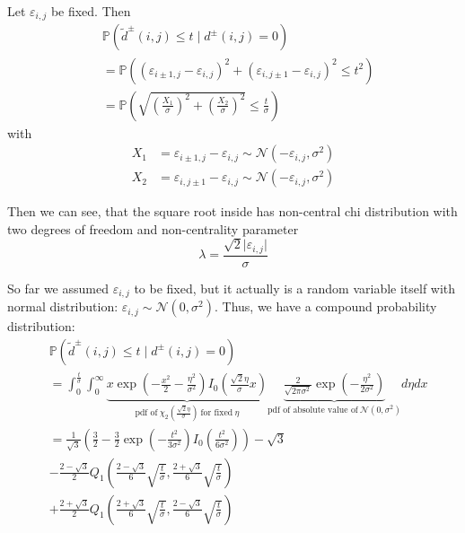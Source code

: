 \documentclass{beamer}
\newcommand{\abs}[1]{\lvert#1\rvert}
\begin{document}
\begin{frame}
	Let $\varepsilon_{i, j}$ be fixed. Then
	\begin{align*}
		&\mathbb{P}(\tilde{d}^\pm(i, j) \leq t \mid d^\pm(i, j) = 0) \\
		&= \mathbb{P}\left( (\varepsilon_{i \pm 1, j} - \varepsilon_{i, j})^2 + (\varepsilon_{i, j \pm 1} - \varepsilon_{i, j})^2 \leq t^2 \right) \\
		&= \mathbb{P}\left( \sqrt{\left( \frac{X_1}{\sigma} \right)^2 + \left( \frac{X_2}{\sigma} \right)^2} \leq \frac{t}{\sigma} \right)
	\end{align*}
	with
	\begin{align*}
		X_1 &= \varepsilon_{i \pm 1, j} - \varepsilon_{i, j} \sim \mathcal{N}(- \varepsilon_{i, j}, \sigma^2) \\
		X_2 &= \varepsilon_{i, j \pm 1} - \varepsilon_{i, j} \sim \mathcal{N}(- \varepsilon_{i, j}, \sigma^2)
	\end{align*}
	
	Then we can see, that the square root inside has non-central chi distribution with two degrees of freedom and non-centrality parameter
	\begin{equation*}
		\lambda = \frac{\sqrt{2} \abs{\varepsilon_{i, j}}}{\sigma}
	\end{equation*}
\end{frame}

\begin{frame}
	So far we assumed $\varepsilon_{i, j}$ to be fixed, but it actually is a random variable itself with normal distribution: $\varepsilon_{i, j} \sim \mathcal{N}(0, \sigma^2)$. Thus, we have a compound probability distribution:
	\begin{align*}
		&\mathbb{P}(\tilde{d}^\pm(i, j) \leq t \mid d^\pm(i, j) = 0) \\
		&= \int_0^\frac{t}{\sigma} \int_0^\infty \underbrace{x \exp \left( - \frac{x^2}{2} - \frac{\eta^2}{\sigma^2} \right) I_0 \left( \frac{\sqrt{2} \eta}{\sigma} x \right)}_{\textrm{pdf of} \ \chi_2 \left( \frac{\sqrt{2} \eta}{\sigma} \right) \ \textrm{for fixed} \ \eta} \underbrace{\frac{2}{\sqrt{2 \pi \sigma^2}} \exp \left( - \frac{\eta^2}{2 \sigma^2} \right)}_{\textrm{pdf of absolute value of} \ \mathcal{N}(0, \sigma^2)} d\eta dx \\
		&= \frac{1}{\sqrt{3}} \left( \frac{3}{2} - \frac{3}{2} \exp \left( - \frac{t^2}{3 \sigma^2} \right) I_0 \left( \frac{t^2}{6 \sigma^2} \right) \right) - \sqrt{3} \\
		&- \frac{2 - \sqrt{3}}{2} Q_1 \left( \frac{2 - \sqrt{3}}{6} \sqrt{\frac{t}{\sigma}}, \frac{2 + \sqrt{3}}{6} \sqrt{\frac{t}{\sigma}} \right) \\
		&+ \frac{2 + \sqrt{3}}{2} Q_1 \left( \frac{2 + \sqrt{3}}{6} \sqrt{\frac{t}{\sigma}}, \frac{2 - \sqrt{3}}{6} \sqrt{\frac{t}{\sigma}} \right)
	\end{align*}
\end{frame}
\end{document}
